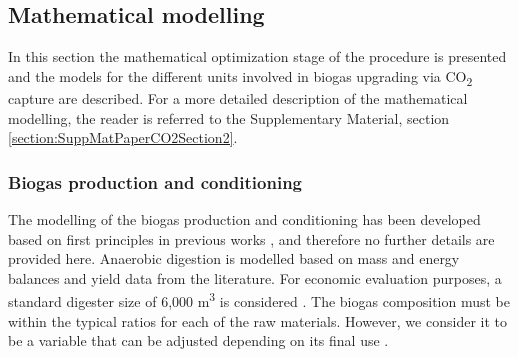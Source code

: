 \begin{refsection}[referencesCh7]
\begin{table}[h]
	\centering
	\caption{CO\textsubscript{2} capture technologies considered in the study.}
	\label{table:Ch7Table2}
\end{table}

\subsection{Mathematical modelling}
In this section the mathematical optimization stage of the procedure is presented and the models for the different units involved in biogas upgrading via CO\textsubscript{2} capture are described. For a more detailed description of the mathematical modelling, the reader is referred to the Supplementary Material, section \ref{section:SuppMatPaperCO2Section2}.

\subsubsection{Biogas production and conditioning} \label{section:BiogasProductionPaperBiogas}
The modelling of the biogas production and conditioning has been developed based on first principles in previous works \citep{leon2016optimal}, and therefore no further details are provided here. Anaerobic digestion is modelled based on mass and energy balances and yield data from the literature. For economic evaluation purposes, a standard digester size of 6,000 m\textsuperscript{3} is considered \citep{rohstoffe2010guia}. The biogas composition must be within the typical ratios for each of the raw materials. However, we consider it to be a variable that can be adjusted depending on its final use \citep{leon2016optimal}.


\end{refsection}
